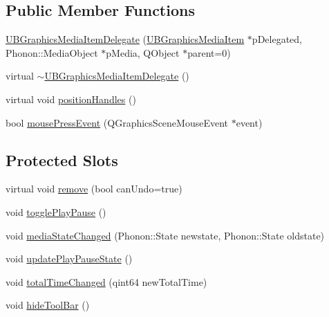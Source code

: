 \subsection*{Public Member Functions}
\begin{DoxyCompactItemize}
\item 
\hyperlink{class_u_b_graphics_media_item_delegate_a4537890b1bc61c757fcfcbac5790a07b}{U\-B\-Graphics\-Media\-Item\-Delegate} (\hyperlink{class_u_b_graphics_media_item}{U\-B\-Graphics\-Media\-Item} $\ast$p\-Delegated, Phonon\-::\-Media\-Object $\ast$p\-Media, Q\-Object $\ast$parent=0)
\item 
virtual \hyperlink{class_u_b_graphics_media_item_delegate_a9a213b64555a1a916c29e760a1d5cde2}{$\sim$\-U\-B\-Graphics\-Media\-Item\-Delegate} ()
\item 
virtual void \hyperlink{class_u_b_graphics_media_item_delegate_a0d2d62936d516875a60975d4f66d3dde}{position\-Handles} ()
\item 
bool \hyperlink{class_u_b_graphics_media_item_delegate_a318cc185f2aca7410e47e3954d6f424a}{mouse\-Press\-Event} (Q\-Graphics\-Scene\-Mouse\-Event $\ast$event)
\end{DoxyCompactItemize}
\subsection*{Protected Slots}
\begin{DoxyCompactItemize}
\item 
virtual void \hyperlink{class_u_b_graphics_media_item_delegate_a921e2e97c0941bb7e795245dcd173074}{remove} (bool can\-Undo=true)
\item 
void \hyperlink{class_u_b_graphics_media_item_delegate_ac947682092d79a94f345660ece49292d}{toggle\-Play\-Pause} ()
\item 
void \hyperlink{class_u_b_graphics_media_item_delegate_a9fc243b8f6883ce50c0aaac3a1461801}{media\-State\-Changed} (Phonon\-::\-State newstate, Phonon\-::\-State oldstate)
\item 
void \hyperlink{class_u_b_graphics_media_item_delegate_ab4ec8a9d4c6c01cf862f37981b13fa53}{update\-Play\-Pause\-State} ()
\item 
void \hyperlink{class_u_b_graphics_media_item_delegate_a79b5a5d5b25fef5e1e3d201e7438944a}{total\-Time\-Changed} (qint64 new\-Total\-Time)
\item 
void \hyperlink{class_u_b_graphics_media_item_delegate_ae84240c2b0aa9af3d0b26662b76cc6b9}{hide\-Tool\-Bar} ()
\end{DoxyCompactItemize}
